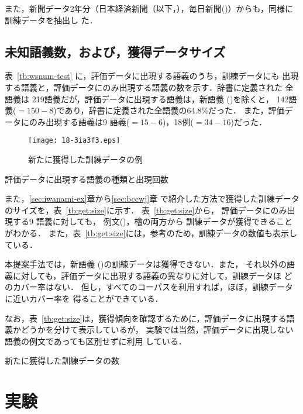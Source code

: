 \documentclass[japanese]{jnlp_1.4}
\newcommand{\EX}{}
\newcommand{\MAI}{}
\newcommand{\NIK}{}
\newcommand{\X}{}
\begin{document}
また，新聞データ2年分（日本経済新聞（以下，\NIK{}），毎日新聞(\MAI)）からも，同様に訓練データを抽出し
た．


\subsection{未知語義数，および，獲得データサイズ} 
\label{sec:get-size}

表~\ref{tb:wsnum-test} に，評価データに出現する語義のうち，訓練データにも
出現する語義と，評価データにのみ出現する語義の数を示す．辞書に定義された
全語義は 219語義だが，評価データに出現する語義は，新語義 (\X)を除くと，
142語義($=150-8$)であり，辞書に定義された全語義の64.8\%だった．
また，評価データにのみ出現する語義は9 語義($=15-6$)，18例($=34-16$)だった．


\begin{figure}[t]
\texttt{[image: 18-3ia3f3.eps]}
\caption{新たに獲得した訓練データの例} 
\label{fig:getOC}
\vspace{1\baselineskip}
\end{figure}
\begin{table}[t]
\caption{評価データに出現する語義の種類と出現回数}
\label{tb:wsnum-test}

\vspace{1\baselineskip}
\end{table}

また，\ref{sec:iwanami-ex}章から\ref{sec:bccwj}章
で紹介した方法で獲得した訓練データのサイズを，表~\ref{tb:get:size}に示す．
表~\ref{tb:get:size}から，
評価データにのみ出現する9 語義に対しても，
例文(\EX)，檜の両方から  訓練データが獲得できることがわかる．
また，表~\ref{tb:get:size}には，参考のため，訓練データの数値も表示している．

本提案手法では，新語義 (\X)の訓練データは獲得できない．また，
それ以外の語義に対しても，評価データに出現する語義の異なりに対して，訓練データほ
どのカバー率はない．
但し，すべてのコーパスを利用すれば，ほぼ，訓練データに近いカバー率を
得ることができている．


なお，表~\ref{tb:get:size}は，獲得傾向を確認するために，評価データに出現する語
義かどうかを分けて表示しているが，
実験では当然，評価データに出現しない語義の例文であっても区別せずに利用
している．

\begin{table}[t]
\caption{新たに獲得した訓練データの数} 
\label{tb:get:size}

\end{table}



\section{実験} 
\label{sec:system}
\end{document}
